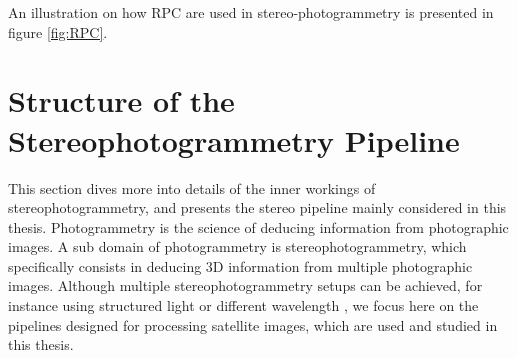 An illustration on how RPC are used in stereo-photogrammetry is presented in figure \ref{fig:RPC}.

\section{Structure of the Stereophotogrammetry Pipeline}\label{sec:classical_stero_pipeline}
This section dives more into details of the inner workings of stereophotogrammetry, and presents the stereo pipeline mainly considered in this thesis. Photogrammetry is the science of deducing information from photographic images. A sub domain of photogrammetry is stereophotogrammetry, which specifically consists in deducing 3D information from multiple photographic images. Although multiple stereophotogrammetry setups can be achieved, for instance using structured light \cite{scharstein_high-accuracy_2003} or different wavelength \cite{geng_rainbow_1996}, we focus here on the pipelines designed for processing satellite images, which are used and studied in this thesis. 

